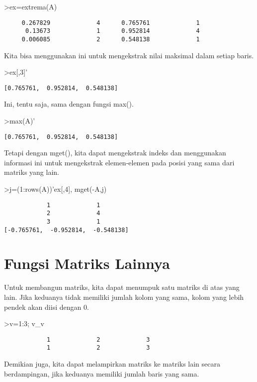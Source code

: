 \documentclass[
]{book}
\begin{document}
\textgreater ex=extrema(A)

\begin{verbatim}
     0.267829             4      0.765761             1 
      0.13673             1      0.952814             4 
     0.006085             2      0.548138             1 
\end{verbatim}

Kita bisa menggunakan ini untuk mengekstrak nilai maksimal dalam setiap baris.

\textgreater ex{[},3{]}'

\begin{verbatim}
[0.765761,  0.952814,  0.548138]
\end{verbatim}

Ini, tentu saja, sama dengan fungsi max().

\textgreater max(A)'

\begin{verbatim}
[0.765761,  0.952814,  0.548138]
\end{verbatim}

Tetapi dengan mget(), kita dapat mengekstrak indeks dan menggunakan informasi ini untuk mengekstrak elemen-elemen pada posisi yang sama dari matriks yang lain.

\textgreater j=(1:rows(A))'\textbar ex{[},4{]}, mget(-A,j)

\begin{verbatim}
            1             1 
            2             4 
            3             1 
[-0.765761,  -0.952814,  -0.548138]
\end{verbatim}

\section{Fungsi Matriks Lainnya}\label{fungsi-matriks-lainnya}

Untuk membangun matriks, kita dapat menumpuk satu matriks di atas yang lain. Jika keduanya tidak memiliki jumlah kolom yang sama, kolom yang lebih pendek akan diisi dengan 0.

\textgreater v=1:3; v\_v

\begin{verbatim}
            1             2             3 
            1             2             3 
\end{verbatim}

Demikian juga, kita dapat melampirkan matriks ke matriks lain secara berdampingan, jika keduanya memiliki jumlah baris yang sama.
\end{document}
